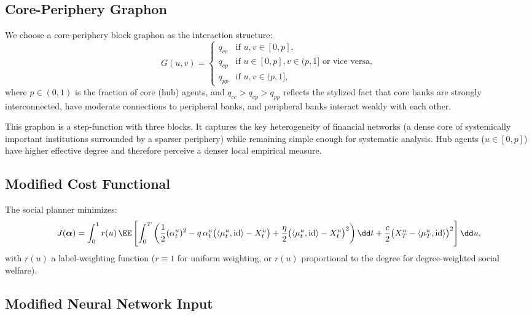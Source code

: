 \documentclass[11pt]{article}
\begin{document}
\subsection{Core-Periphery Graphon}

We choose a core-periphery block graphon as the interaction structure:
\begin{equation}\label{eq:core-periphery}
  G(u,v) = \begin{cases}
    q_{cc} & \text{if } u,v \in [0, p], \\
    q_{cp} & \text{if } u \in [0,p], v \in (p,1] \text{ or vice versa}, \\
    q_{pp} & \text{if } u,v \in (p, 1],
  \end{cases}
\end{equation}
where $p \in (0,1)$ is the fraction of core (hub) agents, and $q_{cc} > q_{cp} > q_{pp}$ reflects the stylized fact that core banks are strongly interconnected, have moderate connections to peripheral banks, and peripheral banks interact weakly with each other.

\begin{remark}
  This graphon is a step-function with three blocks. It captures the key heterogeneity of financial networks (a dense core of systemically important institutions surrounded by a sparser periphery) while remaining simple enough for systematic analysis. Hub agents ($u \in [0,p]$) have higher effective degree and therefore perceive a denser local empirical measure.
\end{remark}

\subsection{Modified Cost Functional}

The social planner minimizes:
\begin{equation}\label{eq:hetero-cost}
  J(\boldsymbol{\alpha}) = \int_0^1 r(u)\,\EE\left[\int_0^T \left(\frac{1}{2}(\alpha_t^u)^2 - q\,\alpha_t^u\big(\langle \mu_t^u, \mathrm{id}\rangle - X_t^u\big) + \frac{\eta}{2}\big(\langle \mu_t^u, \mathrm{id}\rangle - X_t^u\big)^2\right)\dd t + \frac{c}{2}\big(X_T^u - \langle \mu_T^u, \mathrm{id}\rangle\big)^2\right]\dd u,
\end{equation}
with $r(u)$ a label-weighting function (\eg $r \equiv 1$ for uniform weighting, or $r(u)$ proportional to the degree for degree-weighted social welfare).

\subsection{Modified Neural Network Input}
\end{document}
